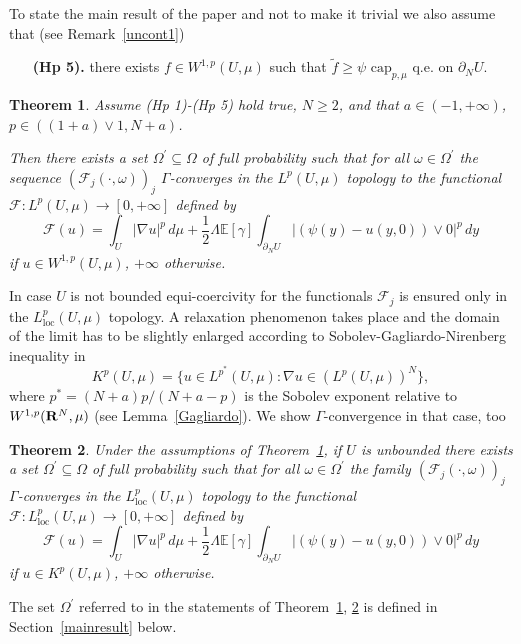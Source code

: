 \documentclass[10pt,reqno]{amsart}
\numberwithin{equation}{section}
\def\R{{\bf R}}
\def\FFepsi{{\mathcal F}_{j}}
\def\Wsp{W^{1,p}}
\def\KpmuU{K^p(U,\mu)}
\def\capmu{\mathrm{cap}_{p,\mu}}
\def\Om{\Omega}
\def\om{\omega}
\def\FFpsi{{\mathcal F}}
\def\xnc{y}%
\def\UU{\partial_NU}
\newtheorem{theorem}{Theorem}[section]
\begin{document}
To state the main result of the paper and not to make it trivial
we also assume that (see Remark~\ref{uncont1})
\begin{itemize}
\item[{\bf (Hp 5).}] there exists $f\in\Wsp(U,\mu)$ such that
$\tilde{f}\geq\psi$ $\capmu$ q.e. on $\UU$.
\end{itemize}


\begin{theorem}\label{main}
Assume (Hp 1)-(Hp 5) hold true, $N\geq 2$, and that $a\in(-1,+\infty)$,
$p\in((1+a)\vee 1,N+a)$.

Then there exists a set $\Om^\prime\subseteq\Om$ of full probability
such that for all $\om\in\Om^\prime$ the sequence
$(\FFepsi(\cdot,\om))_j$ $\Gamma$-converges in the $L^p(U,\mu)$
topology to the functional $\FFpsi:L^p(U,\mu)\to[0,+\infty]$ defined by
\begin{equation}\label{eq:Glimit}
\FFpsi(u)=\int_U|\nabla u|^p\,d\mu+\frac 12
\Lambda\mathbb{E}[\gamma]
\int_{\UU}|(\psi(\xnc)-u(\xnc,0))\vee 0|^p\,d\xnc
\end{equation}
if $u\in \Wsp(U,\mu)$, $+\infty$ otherwise.
\end{theorem}
In case $U$ is not bounded equi-coercivity for the functionals 
$\FFepsi$ is ensured only in the $L^p_{\mathrm{loc}}(U,\mu)$ topology. 
A relaxation phenomenon takes place and the domain of the limit 
has to be slightly enlarged according to Sobolev-Gagliardo-Nirenberg 
inequality in 
\begin{equation}\label{kpmu}
\KpmuU=\{u\in L^{p^\ast}(U,\mu): \nabla u\in (L^p(U,\mu))^N\},
\end{equation}
where $p^\ast=(N+a)p/(N+a-p)$ is the Sobolev exponent relative 
to $\Wsp(\R^N,\mu)$ (see Lemma~\ref{Gagliardo}). %
We show $\Gamma$-convergence in that case, too
\begin{theorem}\label{main-unbdd}
Under the assumptions of Theorem~\ref{main}, if $U$ is unbounded 
there exists a set $\Om^\prime\subseteq\Om$ of full probability
such that for all $\om\in\Om^\prime$
the family $(\FFepsi(\cdot,\om))_j$ $\Gamma$-converges in the
$L^p_{\mathrm{loc}}(U,\mu)$ topology to  the functional 
 $\FFpsi:L^p_{\mathrm{loc}}(U,\mu)\to[0,+\infty]$ defined by
\begin{equation}\label{eq:Glimit}
\FFpsi(u)=\int_U|\nabla u|^p\,d\mu+\frac 12
\Lambda\mathbb{E}[\gamma]
\int_{\UU}|(\psi(\xnc)-u(\xnc,0))\vee 0|^p\,d\xnc
\end{equation}
if $u\in\KpmuU$, $+\infty$ otherwise.

\end{theorem}
The set $\Om^\prime$ referred to in the statements of Theorem~\ref{main},
\ref{main-unbdd} is defined in Section~\ref{mainresult} below.
\end{document}

